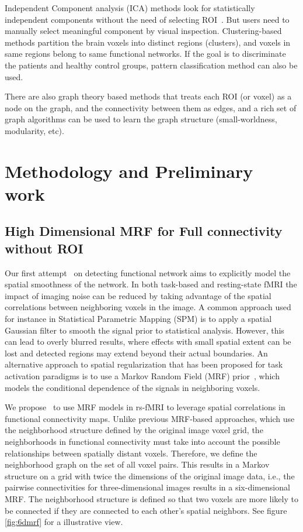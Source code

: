 \documentclass[12pt]{article}
\begin{document}
Independent Component analysis (ICA) methods look for statistically independent
components without the need of selecting ROI~\cite{calhoun2001spatial}. But
users need to manually select meaningful component by visual
inspection. Clustering-based methods partition the brain voxels into distinct
regions (clusters), and voxels in same regions belong to same functional
networks. If the goal is to discriminate the patients and healthy control
groups, pattern classification method can also be used.

There are also graph theory based methods that treats each ROI (or voxel) as a
node on the graph, and the connectivity between them as edges, and a rich set of
graph algorithms can be used to learn the graph structure (small-worldness,
modularity, etc). 


\section{Methodology and Preliminary work} 
\subsection{High Dimensional MRF for Full connectivity without ROI}\label{sec:highmrf}
Our first attempt~\cite{liu2010spatial} on detecting functional network aims to
explicitly model the spatial smoothness of the network. In both task-based and
resting-state fMRI the impact of imaging noise can be reduced by taking
advantage of the spatial correlations between neighboring voxels in the image. A
common approach used for instance in Statistical Parametric Mapping
(SPM)\cite{worsley_analysis_1995} is to apply a spatial Gaussian filter to
smooth the signal prior to statistical analysis. However, this can lead to
overly blurred results, where effects with small spatial extent can be lost and
detected regions may extend beyond their actual boundaries. An alternative
approach to spatial regularization that has been proposed for task activation
paradigms is to use a Markov Random Field (MRF)
prior~\cite{ou_spatial_2005,descombes_spatio-temporal_1998,descombes_fmri_1998,woolrich_fully_2004,cosman_exact_2004},
which models the conditional dependence of the signals in neighboring voxels.

We propose~\cite{liu2010spatial} to use MRF models in rs-fMRI to leverage spatial
correlations in functional connectivity maps. Unlike previous MRF-based
approaches, which use the neighborhood structure defined by the original image
voxel grid, the neighborhoods in functional connectivity must take into account
the possible relationships between spatially distant voxels. Therefore, we
define the neighborhood graph on the set of all voxel pairs. This results in a
Markov structure on a grid with twice the dimensions of the original image data,
i.e., the pairwise connectivities for three-dimensional images results in a
six-dimensional MRF. The neighborhood structure is defined so that two voxels
are more likely to be connected if they are connected to each other's spatial
neighbors. See figure \ref{fig:6dmrf} for a illustrative view.
\end{document}
